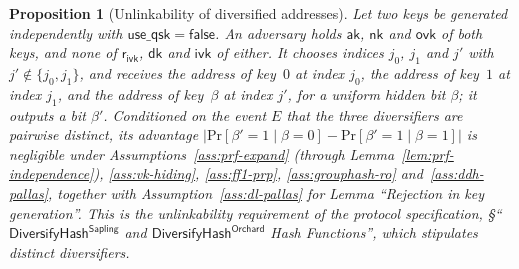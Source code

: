 \documentclass[11pt,a4paper]{article}
\newtheorem{proposition}[theorem]{Proposition}
\theoremstyle{definition}
\renewcommand{\Pr}{\mathrm{Pr}}
\newcommand{\aksym}{\ensuremath{\mathsf{ak}}}
\newcommand{\nksym}{\ensuremath{\mathsf{nk}}}
\newcommand{\ivk}{\ensuremath{\mathsf{ivk}}}
\newcommand{\ovk}{\ensuremath{\mathsf{ovk}}}
\newcommand{\dk}{\ensuremath{\mathsf{dk}}}
\newcommand{\rivk}{\ensuremath{\mathsf{r_{ivk}}}}
\begin{document}
\begin{proposition}[Unlinkability of diversified addresses]%
\label{prop:addr-unlinkable}
Let two keys be generated independently with
$\mathsf{use\_qsk} = \mathsf{false}$. An adversary holds $\aksym$, $\nksym$
and $\ovk$ of both keys, and none of $\rivk$, $\dk$ and $\ivk$ of either. It
chooses indices $j_0$, $j_1$ and $j'$ with $j' \notin \{j_0, j_1\}$, and
receives the address of key~$0$ at index $j_0$, the address of key~$1$ at
index $j_1$, and the address of key~$\beta$ at index $j'$, for a uniform
hidden bit $\beta$; it outputs a bit $\beta'$. Conditioned on the event $E$
that the three diversifiers are pairwise distinct, its advantage
$\bigl|\Pr[\beta' = 1 \mid \beta = 0] - \Pr[\beta' = 1 \mid \beta = 1]\bigr|$
is negligible under Assumptions~\ref{ass:prf-expand} (through
Lemma~\ref{lem:prf-independence}), \ref{ass:vk-hiding}, \ref{ass:ff1-prp},
\ref{ass:grouphash-ro} and~\ref{ass:ddh-pallas}, together with
Assumption~\ref{ass:dl-pallas} for Lemma ``Rejection in key generation''.
This is the unlinkability requirement of the protocol specification,
\S``$\mathsf{DiversifyHash}^{\mathsf{Sapling}}$ and
$\mathsf{DiversifyHash}^{\mathsf{Orchard}}$ Hash Functions'', which
stipulates distinct diversifiers.
\end{proposition}
\end{document}
